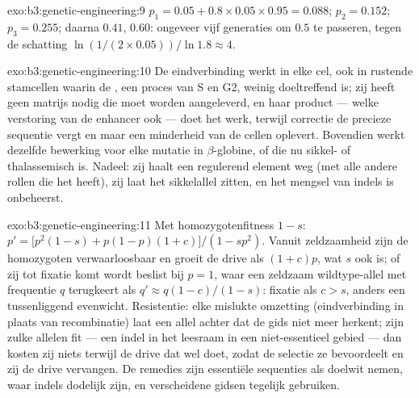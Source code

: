 \begin{solution}{exo:b3:genetic-engineering:9}
$p_{1} = 0.05 + 0.8\times 0.05\times 0.95 = 0.088$; $p_{2} = 0.152$;
$p_{3} = 0.255$; daarna $0.41$, $0.60$: ongeveer vijf generaties om
$0.5$ te passeren, tegen de schatting $\ln(1/(2\times 0.05))/\ln 1.8 \approx 4$.
\end{solution}

\begin{solution}{exo:b3:genetic-engineering:10}
De eindverbinding werkt in elke cel, ook in rustende stamcellen waarin
de , een proces van S en G2, weinig doeltreffend
is; zij heeft geen matrijs nodig die moet worden aangeleverd, en haar
product --- welke verstoring van de enhancer ook --- doet het werk,
terwijl correctie de precieze sequentie vergt en maar een minderheid van
de cellen oplevert. Bovendien werkt dezelfde bewerking voor elke mutatie
in $\beta$-globine, of die nu sikkel- of thalassemisch is. Nadeel: zij
haalt een regulerend element weg (met alle andere rollen die het heeft),
zij laat het sikkelallel zitten, en het mengsel van indels is
onbeheerst.
\end{solution}

\begin{solution}{exo:b3:genetic-engineering:11}
Met homozygotenfitness $1 - s$: $p' = \bigl[p^{2}(1-s) + p(1-p)(1+c)
\bigr]/(1 - sp^{2})$. Vanuit zeldzaamheid zijn de homozygoten
verwaarloosbaar en groeit de drive als $(1+c)p$, wat $s$ ook is; of zij
tot fixatie komt wordt beslist bij $p = 1$, waar een zeldzaam
wildtype-allel met frequentie $q$ terugkeert als
$q' \approx q(1-c)/(1-s)$: fixatie als $c > s$, anders een
tussenliggend evenwicht. Resistentie: elke mislukte omzetting
(eindverbinding in plaats van recombinatie) laat een allel achter dat
de gids niet meer herkent; zijn zulke allelen fit --- een indel in het
leesraam in een niet-essentieel gebied --- dan kosten zij niets terwijl
de drive dat wel doet, zodat de selectie ze bevoordeelt en zij de drive
vervangen. De remedies zijn essentiële sequenties als doelwit nemen,
waar indels dodelijk zijn, en verscheidene gidsen tegelijk gebruiken.
\end{solution}

